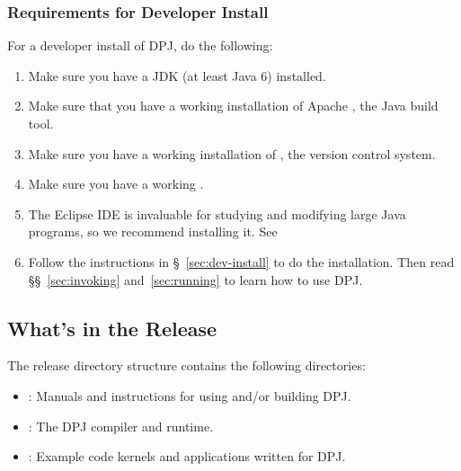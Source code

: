 \subsubsection{Requirements for Developer Install%
\label{sec:buildDPJ}}
For a developer install of DPJ, do the following:
\begin{enumerate}
\item Make sure you have a JDK (at least Java 6) installed.
\item Make sure that you have a working installation of Apache
  , the Java build tool.
\item Make sure you have a working installation of , the
  version control system.
%
\item Make sure you have a working .
\item The Eclipse IDE is invaluable for studying and modifying large
  Java programs, so we recommend installing it.  See
%
\item Follow the instructions in \S~\ref{sec:dev-install} to do the
  installation.  Then read \S\S~\ref{sec:invoking}
  and~\ref{sec:running} to learn how to use DPJ.
\end{enumerate}

\subsection{What's in the Release}
The release directory structure contains the following directories:
\begin{itemize}
\item {}: Manuals and instructions for using and/or
  building DPJ.
\item {}: The DPJ compiler and runtime.
\item {}: Example code kernels and applications written
  for DPJ.
\end{itemize}

